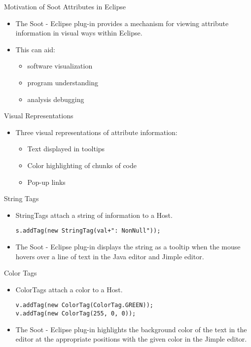 \begin{slide}{Motivation of Soot Attributes in Eclipse}
\begin{itemize}
\item The Soot - Eclipse plug-in provides a mechanism for viewing
attribute information in visual ways within Eclipse.
\item This can aid:
\begin{itemize}
\item software visualization
\item program understanding
\item analysis debugging
\end{itemize}
\end{itemize}
\end{slide}

\begin{slide}{Visual Representations}
\begin{itemize}
\item Three visual representations of attribute information:
\begin{itemize}
\item Text displayed in tooltips
\item Color highlighting of chunks of code
\item Pop-up links
\end{itemize}
\end{itemize}
\end{slide}

\begin{slide}{String Tags}
\begin{itemize}
\item {\red StringTag}s attach a string of information to a {\red Host}.
{\scriptsize
\begin{verbatim}
s.addTag(new StringTag(val+": NonNull"));
\end{verbatim}
}
\item The Soot - Eclipse plug-in displays the string as a tooltip when the mouse hovers over a line of text in the Java editor and Jimple editor.
\end{itemize}
\end{slide}

\begin{slide}{Color Tags}
\begin{itemize}
\item {\red ColorTag}s attach a color to a {\red Host}.
{\scriptsize
\begin{verbatim}
v.addTag(new ColorTag(ColorTag.GREEN));
v.addTag(new ColorTag(255, 0, 0));
\end{verbatim}
}
\item The Soot - Eclipse plug-in highlights the background color of the text in the editor at the appropriate positions with the given color in the Jimple editor.
\end{itemize}
\end{slide}

